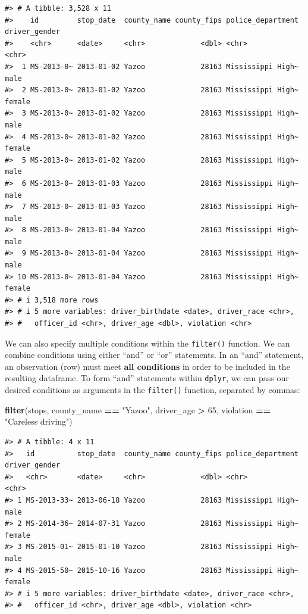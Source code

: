 \documentclass[
]{book}
\newenvironment{Shaded}{\begin{snugshade}}{\end{snugshade}}
\newcommand{\DecValTok}[1]{\textcolor[rgb]{0.00,0.00,0.81}{#1}}
\newcommand{\FunctionTok}[1]{\textcolor[rgb]{0.13,0.29,0.53}{\textbf{#1}}}
\newcommand{\NormalTok}[1]{#1}
\newcommand{\SpecialCharTok}[1]{\textcolor[rgb]{0.81,0.36,0.00}{\textbf{#1}}}
\newcommand{\StringTok}[1]{\textcolor[rgb]{0.31,0.60,0.02}{#1}}
\begin{document}
\begin{verbatim}
#> # A tibble: 3,528 x 11
#>    id         stop_date  county_name county_fips police_department driver_gender
#>    <chr>      <date>     <chr>             <dbl> <chr>             <chr>        
#>  1 MS-2013-0~ 2013-01-02 Yazoo             28163 Mississippi High~ male         
#>  2 MS-2013-0~ 2013-01-02 Yazoo             28163 Mississippi High~ female       
#>  3 MS-2013-0~ 2013-01-02 Yazoo             28163 Mississippi High~ male         
#>  4 MS-2013-0~ 2013-01-02 Yazoo             28163 Mississippi High~ female       
#>  5 MS-2013-0~ 2013-01-02 Yazoo             28163 Mississippi High~ male         
#>  6 MS-2013-0~ 2013-01-03 Yazoo             28163 Mississippi High~ male         
#>  7 MS-2013-0~ 2013-01-03 Yazoo             28163 Mississippi High~ male         
#>  8 MS-2013-0~ 2013-01-04 Yazoo             28163 Mississippi High~ male         
#>  9 MS-2013-0~ 2013-01-04 Yazoo             28163 Mississippi High~ male         
#> 10 MS-2013-0~ 2013-01-04 Yazoo             28163 Mississippi High~ female       
#> # i 3,518 more rows
#> # i 5 more variables: driver_birthdate <date>, driver_race <chr>,
#> #   officer_id <chr>, driver_age <dbl>, violation <chr>
\end{verbatim}

We can also specify multiple conditions within the \texttt{filter()} function. We can combine conditions using either ``and'' or ``or'' statements. In an ``and'' statement, an observation (row) must meet \textbf{all conditions} in order to be included in the resulting dataframe. To form ``and'' statements within \texttt{dplyr}, we can pass our desired conditions as arguments in the \texttt{filter()} function, separated by commas:

\begin{Shaded}
\begin{Highlighting}[]
\FunctionTok{filter}\NormalTok{(stops, county\_name }\SpecialCharTok{==} \StringTok{"Yazoo"}\NormalTok{, }
\NormalTok{       driver\_age }\SpecialCharTok{\textgreater{}} \DecValTok{65}\NormalTok{,}
\NormalTok{       violation }\SpecialCharTok{==} \StringTok{"Careless driving"}\NormalTok{)}
\end{Highlighting}
\end{Shaded}

\begin{verbatim}
#> # A tibble: 4 x 11
#>   id          stop_date  county_name county_fips police_department driver_gender
#>   <chr>       <date>     <chr>             <dbl> <chr>             <chr>        
#> 1 MS-2013-33~ 2013-06-18 Yazoo             28163 Mississippi High~ male         
#> 2 MS-2014-36~ 2014-07-31 Yazoo             28163 Mississippi High~ female       
#> 3 MS-2015-01~ 2015-01-10 Yazoo             28163 Mississippi High~ male         
#> 4 MS-2015-50~ 2015-10-16 Yazoo             28163 Mississippi High~ female       
#> # i 5 more variables: driver_birthdate <date>, driver_race <chr>,
#> #   officer_id <chr>, driver_age <dbl>, violation <chr>
\end{verbatim}
\end{document}
